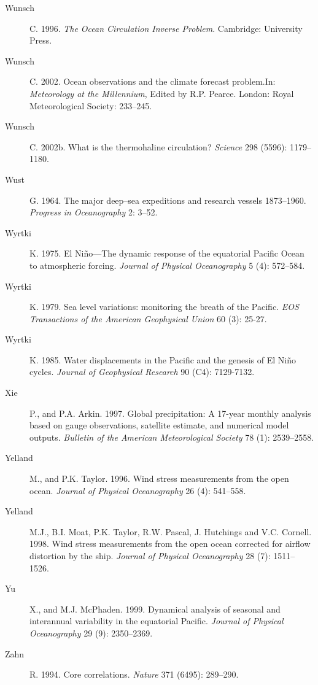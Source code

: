 \begin{description}
\item [Wunsch]C. 1996. \textit{The Ocean Circulation Inverse Problem}.  Cambridge: University Press.

\item [Wunsch]C. 2002. Ocean observations and the climate forecast problem.In: \textit{Meteorology at the Millennium}, Edited by R.P. Pearce. London: Royal Meteorological Society: 233--245.

\item [Wunsch]C. 2002b. What is the thermohaline circulation? \textit{Science} 298 (5596): 1179--1180.

\item [Wust]G. 1964. The major deep--sea expeditions and research vessels 1873--1960. \textit{Progress in Oceanography} 2: 3--52.

\item [Wyrtki]K. 1975. El Ni\~{n}o---The dynamic response of the equatorial
Pacific Ocean to atmospheric forcing. \textit{Journal of Physical Oceanography} 5
(4): 572--584.

\item [Wyrtki]K. 1979. Sea level variations: monitoring the breath of the Pacific. \textit{EOS Transactions of the American Geophysical Union} 60 (3): 25-27.

\item [Wyrtki]K. 1985. Water displacements in the Pacific and the genesis of El Ni\~{n}o cycles. \textit{Journal of Geophysical Research} 90 (C4): 7129-7132.
	
\item [Xie]P., and P.A. Arkin. 1997. Global precipitation: A 17-year monthly analysis based on gauge observations, satellite estimate, and numerical model outputs. \textit{ Bulletin of the American Meteorological Society} 78 (1):
2539--2558.

\item [Yelland]M., and P.K. Taylor. 1996. Wind stress measurements from the open
ocean. \textit{Journal of Physical Oceanography} 26 (4): 541--558.

\item [Yelland]M.J., B.I. Moat, P.K. Taylor, R.W. Pascal, J. Hutchings and V.C. Cornell. 1998. Wind stress measurements from the open ocean corrected for airflow distortion by the ship. \textit{Journal of Physical Oceanography} 28 (7): 1511--1526.

\item [Yu]X., and M.J. McPhaden. 1999. Dynamical analysis of seasonal and interannual variability in the equatorial Pacific. \textit{Journal of Physical Oceanography} 29 (9): 2350--2369.

\item [Zahn]R. 1994. Core correlations. \textit{Nature} 371 (6495): 289--290.

\end{description}